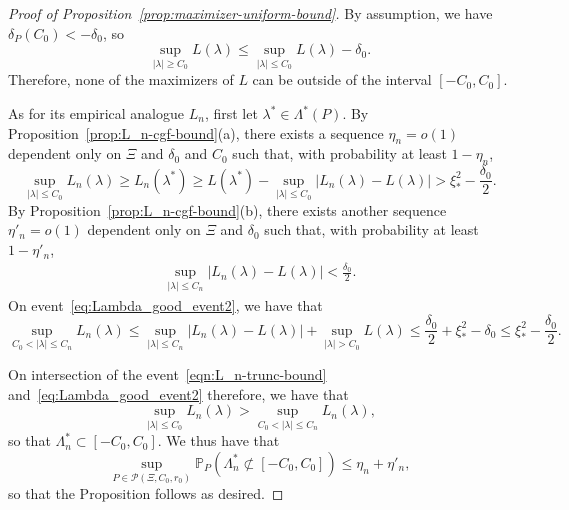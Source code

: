 \documentclass{article}
\theoremstyle{definition}
\newcommand{\1}{\mathbbm{1}}
\begin{document}
\begin{proof}[Proof of Proposition~\ref{prop:maximizer-uniform-bound}]
By assumption, we have $\delta_P(C_0) < -\delta_0$, so 
\[
\sup_{|\lambda| \geq C_0} L(\lambda) \leq \sup_{|\lambda| \leq C_0} L(\lambda) - \delta_0.
\]
Therefore, none of the maximizers of $L$ can be outside of the interval $[-C_0, C_0]$. 

As for its empirical analogue $L_n$, first let $\lambda^* \in \Lambda^*(P)$. By Proposition~\ref{prop:L_n-cgf-bound}(a), there exists a sequence $\eta_n = o(1)$ dependent only on $\Xi$ and $\delta_0$ and $C_0$ such that, with probability at least $1 - \eta_n$, 
    \begin{equation}
        \sup_{|\lambda| \leq C_0} L_n(\lambda) \geq L_n(\lambda^*) \geq L(\lambda^*) - \sup_{|\lambda| \leq C_0} |L_n(\lambda) - L(\lambda)| > \xi_*^2 - \frac{\delta_0}{2}.
        \label{eqn:L_n-trunc-bound}
    \end{equation}
    By Proposition~\ref{prop:L_n-cgf-bound}(b), there exists another sequence $\eta'_n = o(1)$ dependent only on $\Xi$ and $\delta_0$ such that, with probability at least $1 - \eta'_n$, 
    \begin{align}
    \sup_{|\lambda| \leq C_n} |L_n(\lambda) - L(\lambda)| < \frac{\delta_0}{2}.  \label{eq:Lambda_good_event2}
    \end{align}
    On event~\eqref{eq:Lambda_good_event2}, we have that
    \[
    \sup_{C_0 < |\lambda| \leq C_n} L_n(\lambda) \leq \sup_{|\lambda| \leq C_n} |L_n(\lambda) - L(\lambda)| + \sup_{|\lambda| > C_0} L(\lambda) \leq \frac{\delta_0}{2} + \xi_*^2 - \delta_0 \leq \xi_*^2 - \frac{\delta_0}{2}.
    \]

    On intersection of the event~\eqref{eqn:L_n-trunc-bound} and~\eqref{eq:Lambda_good_event2} therefore, we have that
    \[
    \sup_{|\lambda| \leq C_0} L_n(\lambda) > \sup_{C_0 < |\lambda| \leq C_n} L_n(\lambda),
    \]
    so that $\Lambda^*_n \subset [-C_0, C_0]$. We thus have that
    \[
\sup_{P \in \mathcal{P}(\Xi, C_0, r_0) }\mathbb{P}_P(\Lambda^*_n \not\subset [-C_0, C_0]) \leq \eta_n + \eta'_n,
    \]
    so that the Proposition follows as desired. 
\end{proof}
\end{document}
